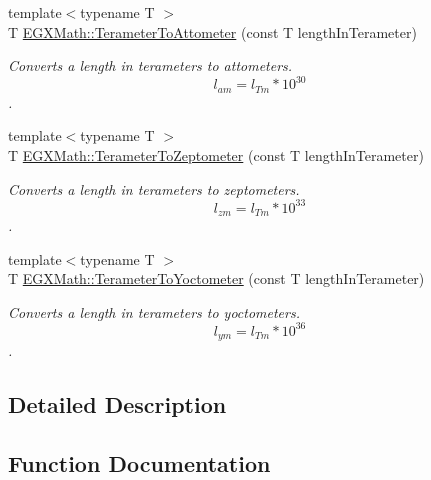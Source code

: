 \begin{DoxyCompactItemize}
{\footnotesize template$<$typename T $>$ }\\T \mbox{\hyperlink{group___e_g_x_math-_conversions-_length_conversions-_s_i-_terameter-_s_i_ga985f6a434acb7bb9b9ceeaeb55172cdf}{E\+G\+X\+Math\+::\+Terameter\+To\+Attometer}} (const T length\+In\+Terameter)
\begin{DoxyCompactList}\small\item\em Converts a length in terameters to attometers. \[ l_{am}=l_{Tm} * 10^{30} \]. \end{DoxyCompactList}\item 
{\footnotesize template$<$typename T $>$ }\\T \mbox{\hyperlink{group___e_g_x_math-_conversions-_length_conversions-_s_i-_terameter-_s_i_ga2347b883d209d99cd37a4f273a1c6920}{E\+G\+X\+Math\+::\+Terameter\+To\+Zeptometer}} (const T length\+In\+Terameter)
\begin{DoxyCompactList}\small\item\em Converts a length in terameters to zeptometers. \[ l_{zm}=l_{Tm} * 10^{33} \]. \end{DoxyCompactList}\item 
{\footnotesize template$<$typename T $>$ }\\T \mbox{\hyperlink{group___e_g_x_math-_conversions-_length_conversions-_s_i-_terameter-_s_i_ga8cdb09d983691434d45c52808465c92f}{E\+G\+X\+Math\+::\+Terameter\+To\+Yoctometer}} (const T length\+In\+Terameter)
\begin{DoxyCompactList}\small\item\em Converts a length in terameters to yoctometers. \[ l_{ym}=l_{Tm} * 10^{36} \]. \end{DoxyCompactList}\end{DoxyCompactItemize}


\subsection{Detailed Description}


\subsection{Function Documentation}
\mbox{\label{group___e_g_x_math-_conversions-_length_conversions-_s_i-_terameter-_s_i_ga985f6a434acb7bb9b9ceeaeb55172cdf}} 
